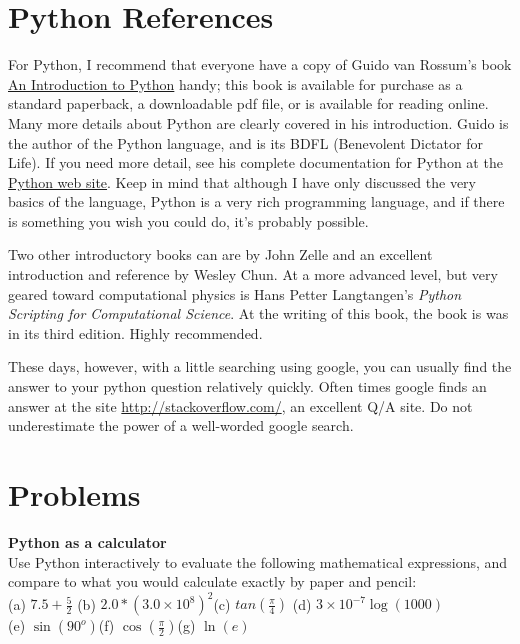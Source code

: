 \section{Python References}
\label{sec-references}
For Python, I recommend that everyone have a copy of Guido van Rossum's book\cite{guido-introduction} \href{http://www.network-theory.co.uk/docs/pytut/}{An Introduction to Python} handy; this book is available for purchase as a standard paperback, a downloadable pdf file, or is available for reading online. Many more details about Python are clearly covered in his introduction. Guido is the author of the Python language, and is its BDFL (Benevolent Dictator for Life). If you need more detail, see his complete documentation for Python at the \href{http://www.python.org/doc/}{Python web site}. Keep in mind that although I have only discussed the very basics of the language, Python is a very rich programming language, and if there is something you wish you could do, it's probably possible. 

Two other introductory books can are by John Zelle\cite{zelle} and an excellent introduction and reference by Wesley Chun\cite{chun2007}. At a more advanced level, but very geared toward computational physics is Hans Petter Langtangen's \textit{Python Scripting for Computational Science}\cite{langtangen-3ed}. At the writing of this book, the book is was in its third edition. Highly recommended.

These days, however, with a little searching using google, you can usually find the answer to your python question relatively quickly. Often times google finds an answer at the site \href{http://stackoverflow.com/}{http://stackoverflow.com/}, an excellent Q/A site. Do not underestimate the power of 
a well-worded google search. 

\pagebreak
%
%
\section*{Problems}
%
\begin{prob}
\label{prob:calculator}

\textbf{\large Python as a calculator}\\
Use Python interactively to evaluate the following mathematical expressions, and compare to what you would calculate exactly by paper and pencil:\\
(a) $7.5 + \frac{5}{2}$ \hfill (b) $2.0*(3.0\times 10^8)^2$\hfill (c) $tan(\frac{\pi}{4})$ \hfill (d) $3\times 10^{-7}\log (1000)$\\
(e) $\sin(90^o)$\hfill (f) $\cos(\frac{\pi}{2})$\hfill (g) $\ln(e)$\\

\end{prob}




